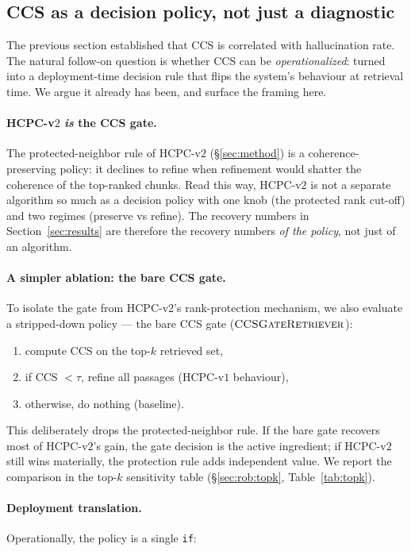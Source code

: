 \subsection{CCS as a decision policy, not just a diagnostic}
\label{sec:ccs_policy}

The previous section established that CCS is correlated with
hallucination rate. The natural follow-on question is whether CCS can
be \emph{operationalized}: turned into a deployment-time decision rule
that flips the system's behaviour at retrieval time.  We argue it
already has been, and surface the framing here.

\paragraph{HCPC-v$2$ \emph{is} the CCS gate.}
The protected-neighbor rule of HCPC-v$2$
(\S\ref{sec:method}) is a coherence-preserving policy: it declines to
refine when refinement would shatter the coherence of the top-ranked
chunks. Read this way, HCPC-v$2$ is not a separate algorithm so much
as a decision policy with one knob (the protected rank cut-off) and
two regimes (preserve vs refine). The recovery numbers in
Section~\ref{sec:results} are therefore the recovery numbers
\emph{of the policy}, not just of an algorithm.

\paragraph{A simpler ablation: the bare CCS gate.}
To isolate the gate from HCPC-v$2$'s rank-protection mechanism, we
also evaluate a stripped-down policy --- the bare CCS gate
($\textsc{CCSGateRetriever}$):
\begin{enumerate}
  \item compute CCS on the top-$k$ retrieved set,
  \item if CCS $< \tau$, refine all passages (HCPC-v$1$ behaviour),
  \item otherwise, do nothing (baseline).
\end{enumerate}
This deliberately drops the protected-neighbor rule. If the bare gate
recovers most of HCPC-v$2$'s gain, the gate decision is the active
ingredient; if HCPC-v$2$ still wins materially, the protection rule
adds independent value. We report the comparison in the top-$k$
sensitivity table (\S\ref{sec:rob:topk}, Table~\ref{tab:topk}).

\paragraph{Deployment translation.}
Operationally, the policy is a single \texttt{if}:

